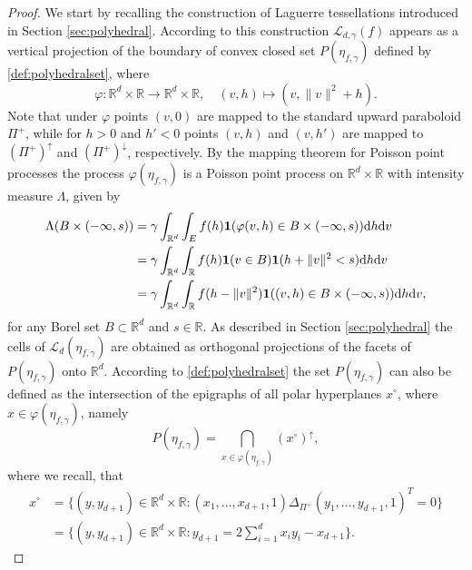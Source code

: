 \documentclass[11pt,a4paper]{article}
\theoremstyle{plain}
\theoremstyle{definition}
\theoremstyle{remark}
\def\RR{\mathbb{R}}
\def\cL{\mathcal{L}}
\newcommand{\dd}{{\rm d}}
\begin{document}
\begin{proof}
    We start by recalling the construction of Laguerre tessellations introduced in Section \ref{sec:polyhedral}. According to this construction $\cL_{d,\gamma}(f)$ appears as a vertical projection of the boundary of convex closed set $P(\eta_{f,\gamma})$ defined by \eqref{def:polyhedralset}, where 
    \[
        \varphi\colon  \RR^d\times\RR \to \RR^d\times\RR, \quad (v,h) \mapsto (v, \|v\|^2+h).
    \]
    Note that under $\varphi$ points $(v,0)$ are mapped to the standard upward paraboloid $\Pi^+$, while for $h>0$ and $h'<0$ points $(v,h)$ and $(v,h')$ are mapped to $(\Pi^{+})^\uparrow$ and $(\Pi^{+})^\downarrow$, respectively. By the mapping theorem for Poisson point processes \cite[Theorem 5.1]{LP} the process $\varphi(\eta_{f,\gamma})$ is a Poisson point process on $\RR^d \times \RR$ with intensity measure $\Lambda$, given by
    \begin{align*}
        \Lambda(B\times (-\infty,s)) &= \gamma\int_{\RR^d} \int_{E} f(h) {\bf 1}(\varphi(v,h) \in B\times (-\infty,s)) \dd h \dd v\\
        &= \gamma\int_{\RR^d} \int_{\RR} f(h) {\bf 1}(v \in B) {\bf 1}(h+\|v\|^2 < s) \dd h \dd v\\
        &= \gamma\int_{\RR^d} \int_{\RR} f(h-\|v\|^2){\bf 1}((v,h) \in B\times (-\infty,s))\dd h \dd v,
    \end{align*}
    for any Borel set $B\subset\RR^d$ and $s\in\RR$. As described in Section \ref{sec:polyhedral} the cells of $\cL_d(\eta_{f,\gamma})$ are obtained as orthogonal projections of the facets of $P(\eta_{f,\gamma})$ onto $\RR^d$. According to \eqref{def:polyhedralset} the set $P(\eta_{f,\gamma})$ can also be defined as the intersection of the epigraphs of all polar hyperplanes $x^\circ$, where $x \in \varphi(\eta_{f,\gamma})$, namely
    \[
        P(\eta_{f,\gamma}) = \bigcap_{x \in \varphi(\eta_{f,\gamma})} (x^{\circ})^\uparrow,
    \]
    where we recall, that
    \begin{align*}
        x^\circ &=\{(y,y_{d+1})\in \RR^d \times \RR: (x_1,\dots , x_{d+1}, 1) \Delta_{\Pi^+} (y_1, \dots, y_{d+1}, 1)^T = 0\}\\
        &=\big\{(y,y_{d+1})\in \RR^d \times \RR: y_{d+1} = 2 \sum_{i=1}^{d} x_i y_i - x_{d+1} \big\}.        
    \end{align*} 
    

\end{proof}
\end{document}
